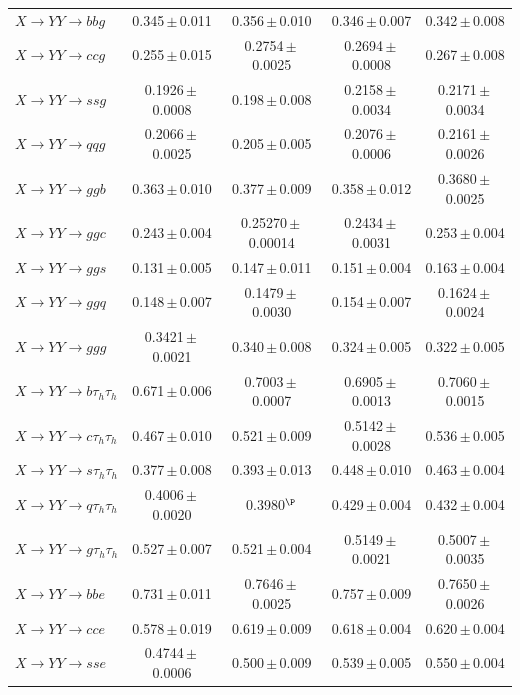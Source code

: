 \begin{landscape}
{\begin{longtable}{@{\extracolsep{\fill}}lcccc@{}}
$X\to YY\to bbg$ & 0.345\,$\pm$\,0.011 & 0.356\,$\pm$\,0.010 & 0.346\,$\pm$\,0.007 & 0.342\,$\pm$\,0.008 \\
$X\to YY\to ccg$ & 0.255\,$\pm$\,0.015 & 0.2754\,$\pm$\,0.0025 & 0.2694\,$\pm$\,0.0008 & 0.267\,$\pm$\,0.008 \\
$X\to YY\to ssg$ & 0.1926\,$\pm$\,0.0008 & 0.198\,$\pm$\,0.008 & 0.2158\,$\pm$\,0.0034 & 0.2171\,$\pm$\,0.0034 \\
$X\to YY\to qqg$ & 0.2066\,$\pm$\,0.0025 & 0.205\,$\pm$\,0.005 & 0.2076\,$\pm$\,0.0006 & 0.2161\,$\pm$\,0.0026 \\
$X\to YY\to ggb$ & 0.363\,$\pm$\,0.010 & 0.377\,$\pm$\,0.009 & 0.358\,$\pm$\,0.012 & 0.3680\,$\pm$\,0.0025 \\
$X\to YY\to ggc$ & 0.243\,$\pm$\,0.004 & 0.25270\,$\pm$\,0.00014 & 0.2434\,$\pm$\,0.0031 & 0.253\,$\pm$\,0.004 \\
$X\to YY\to ggs$ & 0.131\,$\pm$\,0.005 & 0.147\,$\pm$\,0.011 & 0.151\,$\pm$\,0.004 & 0.163\,$\pm$\,0.004 \\
$X\to YY\to ggq$ & 0.148\,$\pm$\,0.007 & 0.1479\,$\pm$\,0.0030 & 0.154\,$\pm$\,0.007 & 0.1624\,$\pm$\,0.0024 \\
$X\to YY\to ggg$ & 0.3421\,$\pm$\,0.0021 & 0.340\,$\pm$\,0.008 & 0.324\,$\pm$\,0.005 & 0.322\,$\pm$\,0.005 \\
\midrule
$X\to YY\to b\tau_h\tau_h$ & 0.671\,$\pm$\,0.006 & 0.7003\,$\pm$\,0.0007 & 0.6905\,$\pm$\,0.0013 & 0.7060\,$\pm$\,0.0015 \\
$X\to YY\to c\tau_h\tau_h$ & 0.467\,$\pm$\,0.010 & 0.521\,$\pm$\,0.009 & 0.5142\,$\pm$\,0.0028 & 0.536\,$\pm$\,0.005 \\
$X\to YY\to s\tau_h\tau_h$ & 0.377\,$\pm$\,0.008 & 0.393\,$\pm$\,0.013 & 0.448\,$\pm$\,0.010 & 0.463\,$\pm$\,0.004 \\
$X\to YY\to q\tau_h\tau_h$ & 0.4006\,$\pm$\,0.0020 & 0.3980$^{\P}$ & 0.429\,$\pm$\,0.004 & 0.432\,$\pm$\,0.004 \\
$X\to YY\to g\tau_h\tau_h$ & 0.527\,$\pm$\,0.007 & 0.521\,$\pm$\,0.004 & 0.5149\,$\pm$\,0.0021 & 0.5007\,$\pm$\,0.0035 \\
\midrule
$X\to YY\to bbe$ & 0.731\,$\pm$\,0.011 & 0.7646\,$\pm$\,0.0025 & 0.757\,$\pm$\,0.009 & 0.7650\,$\pm$\,0.0026 \\
$X\to YY\to cce$ & 0.578\,$\pm$\,0.019 & 0.619\,$\pm$\,0.009 & 0.618\,$\pm$\,0.004 & 0.620\,$\pm$\,0.004 \\
$X\to YY\to sse$ & 0.4744\,$\pm$\,0.0006 & 0.500\,$\pm$\,0.009 & 0.539\,$\pm$\,0.005 & 0.550\,$\pm$\,0.004 \\

\end{longtable}}
\end{landscape}
